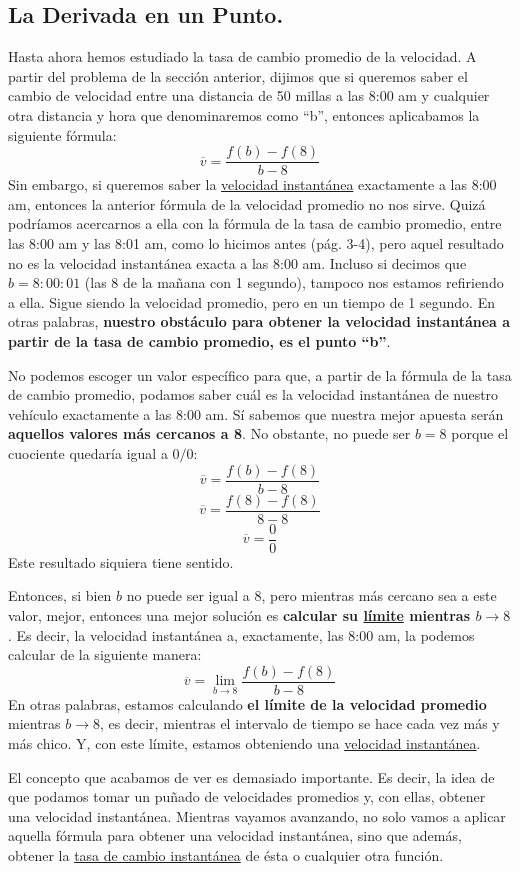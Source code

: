 \documentclass[12pt]{article}
\begin{document}
\subsection{La Derivada en un Punto.}

Hasta ahora hemos estudiado la tasa de cambio promedio de la velocidad. A partir del problema de la sección anterior, dijimos que si queremos saber el cambio de velocidad entre una distancia de 50 millas a las 8:00 am y cualquier otra distancia y hora que denominaremos como ``b'', entonces aplicabamos la siguiente fórmula:
\[\overline{v} = \frac{f(b) - f(8)}{b - 8}\]
Sin embargo, si queremos saber la \underline{velocidad instantánea} exactamente a las 8:00 am, entonces la anterior fórmula de la velocidad promedio no nos sirve. Quizá podríamos acercarnos a ella con la fórmula de la tasa de cambio promedio, entre las 8:00 am y las 8:01 am, como lo hicimos antes (pág. 3-4), pero aquel resultado no es la velocidad instantánea exacta a las 8:00 am. Incluso si decimos que $b = 8:00:01$ (las 8 de la mañana con 1 segundo), tampoco nos estamos refiriendo a ella. Sigue siendo la velocidad promedio, pero en un tiempo de 1 segundo. En otras palabras, \textbf{nuestro obstáculo para obtener la velocidad instantánea a partir de la tasa de cambio promedio, es el punto ``b''}.

No podemos escoger un valor específico para que, a partir de la fórmula de la tasa de cambio promedio, podamos saber cuál es la velocidad instantánea de nuestro vehículo exactamente a las 8:00 am. Sí sabemos que nuestra mejor apuesta serán \textbf{aquellos valores más cercanos a 8}. No obstante, no puede ser $b = 8$ porque el cuociente quedaría igual a $0/0$:
\[\overline{v} = \frac{f(b) - f(8)}{b - 8}\]
\[\overline{v} = \frac{f(8) - f(8)}{8 - 8}\]
\[\overline{v} = \frac{0}{0}\]
Este resultado siquiera tiene sentido.

Entonces, si bien $b$ no puede ser igual a 8, pero mientras más cercano sea a este valor, mejor, entonces una mejor solución es \textbf{calcular su \underline{límite} mientras $b \to 8$}. Es decir, la velocidad instantánea a, exactamente, las 8:00 am, la podemos calcular de la siguiente manera:
\[\overline{v} = \lim_{b \to 8} \frac{f(b) - f(8)}{b - 8}\]
En otras palabras, estamos calculando \textbf{el límite de la velocidad promedio} mientras $b \to 8$, es decir, mientras el intervalo de tiempo se hace cada vez más y más chico. Y, con este límite, estamos obteniendo una \underline{velocidad instantánea}.

El concepto que acabamos de ver es demasiado importante. Es decir, la idea de que podamos tomar un puñado de velocidades promedios y, con ellas, obtener una velocidad instantánea. Mientras vayamos avanzando, no solo vamos a aplicar aquella fórmula para obtener una velocidad instantánea, sino que además, obtener la \underline{tasa de cambio instantánea} de ésta o cualquier otra función.
\end{document}
